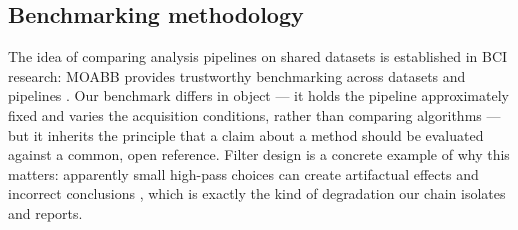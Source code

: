 \subsection*{Benchmarking methodology}
The idea of comparing analysis pipelines on shared datasets is established in BCI
research: MOABB provides trustworthy benchmarking across datasets and pipelines
\citep{jayaram2018moabb}. Our benchmark differs in object --- it holds the pipeline
approximately fixed and varies the acquisition conditions, rather than comparing
algorithms --- but it inherits the principle that a claim about a method should be
evaluated against a common, open reference. Filter design is a concrete example of
why this matters: apparently small high-pass choices can create artifactual effects
and incorrect conclusions \citep{tanner2015filters}, which is exactly the kind of
degradation our chain isolates and reports.
